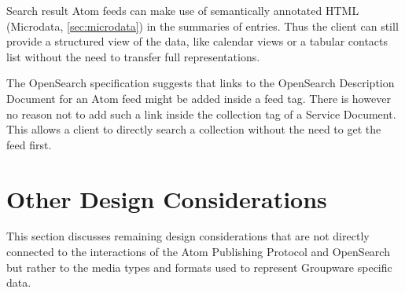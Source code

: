 \documentclass[11pt,a4paper,headsepline,twoside]{scrartcl}		%
\begin{document}
Search result Atom feeds can make use of semantically annotated HTML (Microdata,
\autoref{sec:microdata}) in the summaries of entries. Thus the client can still
provide a structured view of the data, like calendar views or a tabular contacts
list without the need to transfer full representations.

The OpenSearch specification suggests that links to the OpenSearch Description
Document for an Atom feed might be added inside a feed tag. There is however no
reason not to add such a link inside the collection tag of a Service
Document. This allows a client to directly search a collection without the need
to get the feed first.





\section{Other Design Considerations}
\label{sec:design}

This section discusses remaining design considerations that are not directly
connected to the interactions of the Atom Publishing Protocol and OpenSearch but
rather to the media types and formats used to represent Groupware specific data.



\end{document}

